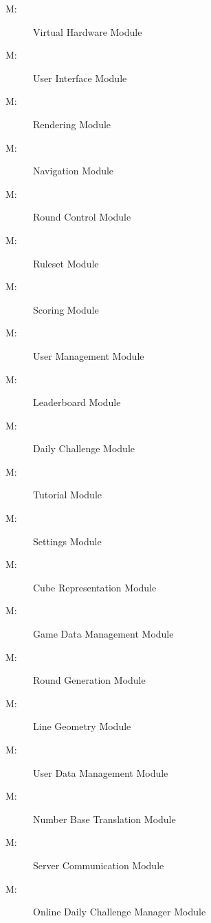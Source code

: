 \documentclass[12pt, titlepage]{article}
\newcounter{mnum}
\newcommand{\mthemnum}{M\themnum}
\begin{document}
\begin{description}
\item [ \mthemnum \label{mVH}:] Virtual Hardware Module

\item [ \mthemnum \label{mUI}:] User Interface Module
\item [ \mthemnum \label{mRE}:] Rendering Module
\item [ \mthemnum \label{mN}:] Navigation Module
\item [ \mthemnum \label{mRC}:] Round Control Module
\item [ \mthemnum \label{mR}:] Ruleset Module
\item [ \mthemnum \label{mSC}:] Scoring Module
\item [ \mthemnum \label{mUM}:] User Management Module
\item [ \mthemnum \label{mL}:] Leaderboard Module
\item [ \mthemnum \label{mDC}:] Daily Challenge Module
\item [ \mthemnum \label{mT}:] Tutorial Module
\item [ \mthemnum \label{mSE}:] Settings Module

\item [ \mthemnum \label{mCR}:] Cube Representation Module
\item [ \mthemnum \label{mGDM}:] Game Data Management Module
\item [ \mthemnum \label{mRG}:] Round Generation Module
\item [ \mthemnum \label{mTG}:] Line Geometry Module
\item [ \mthemnum \label{mUDM}:] User Data Management Module
\item [ \mthemnum \label{mNBT}:] Number Base Translation Module
\item [ \mthemnum \label{mSCM}:] Server Communication Module
\item [ \mthemnum \label{mDCM}:] Online Daily Challenge Manager Module
\end{description}
\end{document}
